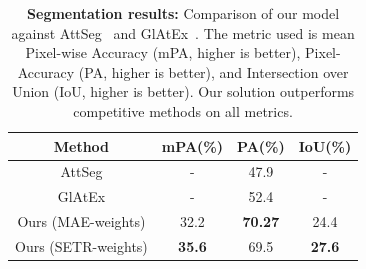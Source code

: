 \begin{table}[t]
\begin{center}
\begin{small}
\begin{sc}
\begin{tabular}{cccc}
\toprule
Method & mPA(\%) & PA(\%) & IoU(\%) \\
\midrule
AttSeg & - & 47.9 & -\\
GlAtEx & - & 52.4 & -\\
Ours (MAE-weights) & 32.2 & \textbf{70.27} & 24.4\\
Ours (SETR-weights) & \textbf{35.6} & 69.5 & \textbf{27.6}\\
\bottomrule
\end{tabular}
\end{sc}
\end{small}
\end{center}
\vskip -0.1in
\caption{\textbf{Segmentation results:} Comparison of our model against AttSeg~\protect\cite{seifi2020segment} and GlAtEx~\protect\cite{seifi2021glimpse}. The metric used is mean Pixel-wise Accuracy (mPA, higher is better), Pixel-Accuracy (PA, higher is better), and Intersection over Union (IoU, higher is better). Our solution outperforms competitive methods on all metrics.}
\label{tab:segmentation}
\end{table}

              
              
              
              
              
              
              
              
              
              
              
              
              
              
              
              
          

              
              
              
              
              
              
              
              
              
              
              
              
